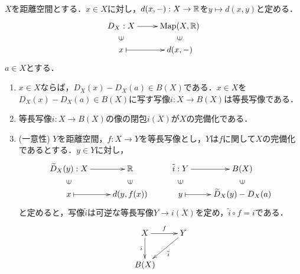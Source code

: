 \documentclass[uplatex,dvipdfmx]{jsreport}
\begin{document}
\begin{proposition}
    $X$を距離空間とする．$x\in X$に対し，$d(x,-):X\to\mathbb{R}$を$y\mapsto d(x,y)$と定める．
    \[\xymatrix@R-2pc{
        D_X:X\ar[r]&\Map(X,\R)\\
        \rotatebox[origin=c]{90}{$\in$}&\rotatebox[origin=c]{90}{$\in$}\\
        x\ar@{|->}[r]&d(x,-)
    }\]
    $a\in X$とする．
    \begin{enumerate}
        \item $x\in X$ならば，$D_X(x)-D_X(a)\in B(X)$である．$x\in X$を$D_X(x)-D_X(a)\in B(X)$に写す写像$i:X\to B(X)$は等長写像である．
        \item 等長写像$i:X\to B(X)$の像の閉包$\overline{i(X)}$が$X$の完備化である．
        \item (一意性) $Y$を距離空間，$f:X\to Y$を等長写像とし，$Y$は$f$に関して$X$の完備化であるとする．$y\in Y$に対し，
        \[\xymatrix@R-2pc{
            \widetilde{D}_X(y):X\ar[r]&\R&\tilde{i}:Y\ar[r]&B(X)\\
            \rotatebox[origin=c]{90}{$\in$}&\rotatebox[origin=c]{90}{$\in$}&\rotatebox[origin=c]{90}{$\in$}&\rotatebox[origin=c]{90}{$\in$}\\
            x\ar@{|->}[r]&d(y,f(x))&y\ar@{|->}[r]&\widetilde{D}_X(y)-D_X(a)
        }\]
        と定めると，写像$\tilde{i}$は可逆な等長写像$Y\to\overline{i(X)}$を定め，$\tilde{i}\circ f=i$である．
        \[\xymatrix{
            X\ar[r]^-f\ar[d]_-i&Y\ar[dl]^-{\o{i}}\\
            B(X)
        }\]
    \end{enumerate}
\end{proposition}
\end{document}
